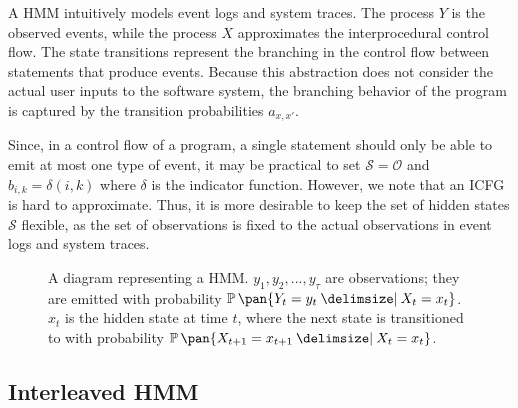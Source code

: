 A HMM intuitively models event logs and system traces. The process \(Y\) is the observed events, while the process \(X\) approximates the interprocedural control flow. The state transitions represent the branching in the control flow between statements that produce events. Because this abstraction does not consider the actual user inputs to the software system, the branching behavior of the program is captured by the transition probabilities \(a_{x,x'}\).

Since, in a control flow of a program, a single statement should only be able to emit at most one type of event, it may be practical to set \(\mathcal{S} = \mathcal{O}\) and \(b_{i,k} = \delta(i,k)\) where \(\delta\) is the indicator function. However, we note that an ICFG is hard to approximate. Thus, it is more desirable to keep the set of hidden states \(\mathcal{S}\) flexible, as the set of observations is fixed to the actual observations in event logs and system traces.

\begin{figure}
    \caption{A diagram representing a HMM. \(y_1, y_2, ..., y_\tau\) are observations; they are emitted with probability \(\prob\pan{Y_t = y_t \giv X_t = x_t}\). \(x_t\) is the hidden state at time \(t\), where the next state is transitioned to with probability \(\prob\pan{X_{t + 1} = x_{t+1} \giv X_t = x_t}\).}
    \label{fig:hmm}
    \vspace{2ex}
\end{figure}

\subsection{Interleaved HMM}\label{sec:interleaved_hmm}

